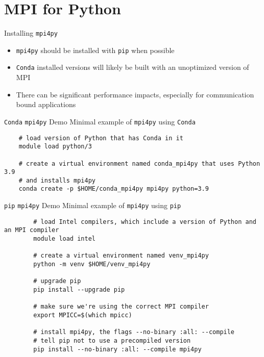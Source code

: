 \section{MPI for Python}

\begin{frame}{Installing  \texttt{mpi4py}}
\begin{itemize}
\item  \texttt{mpi4py} should be installed with \texttt{pip} when possible
\item \texttt{Conda} installed versions will likely be built with an unoptimized version of MPI
\item There can be significant performance impacts, especially for communication bound applications
\end{itemize}
\end{frame}

\begin{frame}[fragile]{\texttt{Conda} \texttt{mpi4py} Demo}
	Minimal example of  \texttt{mpi4py} using \texttt{Conda}
\begin{verbatim}
	# load version of Python that has Conda in it
	module load python/3
	
	# create a virtual environment named conda_mpi4py that uses Python 3.9 
	# and installs mpi4py
	conda create -p $HOME/conda_mpi4py mpi4py python=3.9 
\end{verbatim}
\end{frame}

\begin{frame}[fragile]{\texttt{pip} \texttt{mpi4py} Demo}
	Minimal example of  \texttt{mpi4py} using \texttt{pip}
	\begin{verbatim}
		# load Intel compilers, which include a version of Python and an MPI compiler
		module load intel
		
		# create a virtual environment named venv_mpi4py
		python -m venv $HOME/venv_mpi4py
		
		# upgrade pip
		pip install --upgrade pip
		
		# make sure we're using the correct MPI compiler
		export MPICC=$(which mpicc)
		
		# install mpi4py, the flags --no-binary :all: --compile 
		# tell pip not to use a precompiled version
		pip install --no-binary :all: --compile mpi4py
	\end{verbatim}
\end{frame}

